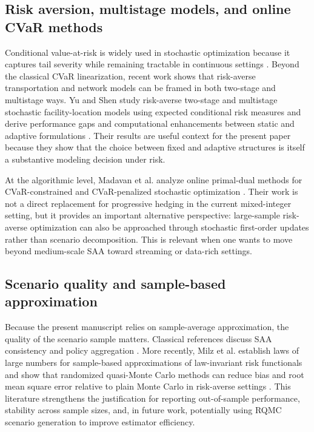 \subsection{Risk aversion, multistage models, and online CVaR methods}
Conditional value-at-risk is widely used in stochastic optimization because it captures tail severity while remaining tractable in continuous settings \cite{rockafellar2000}. Beyond the classical CVaR linearization, recent work shows that risk-averse transportation and network models can be framed in both two-stage and multistage ways. Yu and Shen study risk-averse two-stage and multistage stochastic facility-location models using expected conditional risk measures and derive performance gaps and computational enhancements between static and adaptive formulations \cite{yu2025multistage}. Their results are useful context for the present paper because they show that the choice between fixed and adaptive structures is itself a substantive modeling decision under risk.

At the algorithmic level, Madavan et al. analyze online primal-dual methods for CVaR-constrained and CVaR-penalized stochastic optimization \cite{madavan2021cvar}. Their work is not a direct replacement for progressive hedging in the current mixed-integer setting, but it provides an important alternative perspective: large-sample risk-averse optimization can also be approached through stochastic first-order updates rather than scenario decomposition. This is relevant when one wants to move beyond medium-scale SAA toward streaming or data-rich settings.

\subsection{Scenario quality and sample-based approximation}
Because the present manuscript relies on sample-average approximation, the quality of the scenario sample matters. Classical references discuss SAA consistency and policy aggregation \cite{rockafellar1991,shapiro2009}. More recently, Milz et al. establish laws of large numbers for sample-based approximations of law-invariant risk functionals and show that randomized quasi-Monte Carlo methods can reduce bias and root mean square error relative to plain Monte Carlo in risk-averse settings \cite{melnikov2025rqmc}. This literature strengthens the justification for reporting out-of-sample performance, stability across sample sizes, and, in future work, potentially using RQMC scenario generation to improve estimator efficiency.

